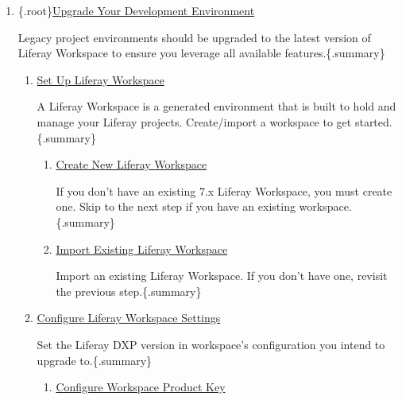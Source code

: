 \begin{enumerate}
\def\labelenumi{\arabic{enumi}.}
\item
  \{.root\}\href{/docs/7-2/tutorials/-/knowledge_base/t/upgrading-your-development-environment}{Upgrade
  Your Development Environment}

  Legacy project environments should be upgraded to the latest version
  of Liferay Workspace to ensure you leverage all available
  features.\{.summary\}

  \begin{enumerate}
  \def\labelenumii{\arabic{enumii}.}
  \item
    \href{/docs/7-2/tutorials/-/knowledge_base/t/upgrading-your-development-environment\#setting-up-liferay-workspace}{Set
    Up Liferay Workspace}

    A Liferay Workspace is a generated environment that is built to hold
    and manage your Liferay projects. Create/import a workspace to get
    started.\{.summary\}

    \begin{enumerate}
    \def\labelenumiii{\arabic{enumiii}.}
    \item
      \href{/docs/7-2/tutorials/-/knowledge_base/t/upgrading-your-development-environment\#creating-new-liferay-workspace}{Create
      New Liferay Workspace}

      If you don't have an existing 7.x Liferay Workspace, you must
      create one. Skip to the next step if you have an existing
      workspace.\{.summary\}
    \item
      \href{/docs/7-2/tutorials/-/knowledge_base/t/upgrading-your-development-environment\#importing-existing-liferay-workspace}{Import
      Existing Liferay Workspace}

      Import an existing Liferay Workspace. If you don't have one,
      revisit the previous step.\{.summary\}
    \end{enumerate}
  \item
    \href{/docs/7-2/tutorials/-/knowledge_base/t/upgrading-your-development-environment\#configuring-liferay-workspace-settings}{Configure
    Liferay Workspace Settings}

    Set the Liferay DXP version in workspace's configuration you intend
    to upgrade to.\{.summary\}

    \begin{enumerate}
    \def\labelenumiii{\arabic{enumiii}.}
    \item
      \href{/docs/7-2/tutorials/-/knowledge_base/t/upgrading-your-development-environment\#configure-workspace-product-key}{Configure
      Workspace Product Key}


\end{enumerate}
\end{enumerate}
\end{enumerate}
